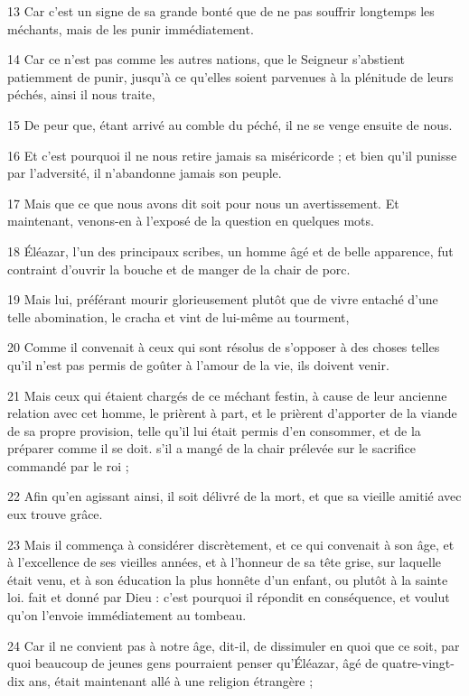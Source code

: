 \par 13 Car c'est un signe de sa grande bonté que de ne pas souffrir longtemps les méchants, mais de les punir immédiatement.
\par 14 Car ce n'est pas comme les autres nations, que le Seigneur s'abstient patiemment de punir, jusqu'à ce qu'elles soient parvenues à la plénitude de leurs péchés, ainsi il nous traite,
\par 15 De peur que, étant arrivé au comble du péché, il ne se venge ensuite de nous.
\par 16 Et c'est pourquoi il ne nous retire jamais sa miséricorde ; et bien qu'il punisse par l'adversité, il n'abandonne jamais son peuple.
\par 17 Mais que ce que nous avons dit soit pour nous un avertissement. Et maintenant, venons-en à l’exposé de la question en quelques mots.
\par 18 Éléazar, l'un des principaux scribes, un homme âgé et de belle apparence, fut contraint d'ouvrir la bouche et de manger de la chair de porc.
\par 19 Mais lui, préférant mourir glorieusement plutôt que de vivre entaché d'une telle abomination, le cracha et vint de lui-même au tourment,
\par 20 Comme il convenait à ceux qui sont résolus de s'opposer à des choses telles qu'il n'est pas permis de goûter à l'amour de la vie, ils doivent venir.
\par 21 Mais ceux qui étaient chargés de ce méchant festin, à cause de leur ancienne relation avec cet homme, le prièrent à part, et le prièrent d'apporter de la viande de sa propre provision, telle qu'il lui était permis d'en consommer, et de la préparer comme il se doit. s'il a mangé de la chair prélevée sur le sacrifice commandé par le roi ;
\par 22 Afin qu'en agissant ainsi, il soit délivré de la mort, et que sa vieille amitié avec eux trouve grâce.
\par 23 Mais il commença à considérer discrètement, et ce qui convenait à son âge, et à l'excellence de ses vieilles années, et à l'honneur de sa tête grise, sur laquelle était venu, et à son éducation la plus honnête d'un enfant, ou plutôt à la sainte loi. fait et donné par Dieu : c'est pourquoi il répondit en conséquence, et voulut qu'on l'envoie immédiatement au tombeau.
\par 24 Car il ne convient pas à notre âge, dit-il, de dissimuler en quoi que ce soit, par quoi beaucoup de jeunes gens pourraient penser qu'Éléazar, âgé de quatre-vingt-dix ans, était maintenant allé à une religion étrangère ;
